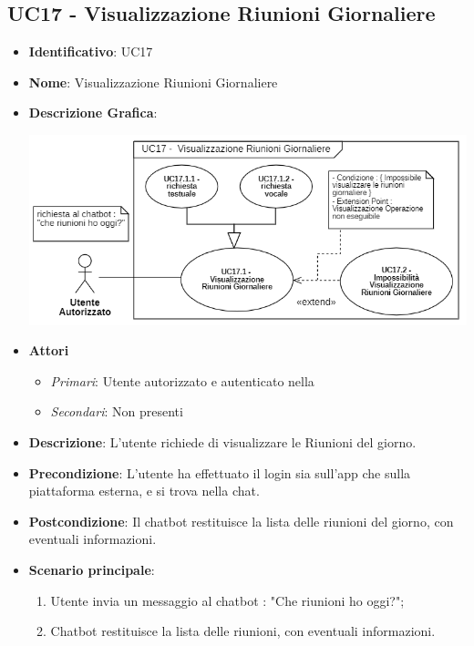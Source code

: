 \subsection{UC17 - Visualizzazione Riunioni Giornaliere }
\begin{itemize}
	\item \textbf{Identificativo}: UC17
	\item \textbf{Nome}: Visualizzazione Riunioni Giornaliere
	\item\textbf{Descrizione Grafica}: 
	\begin{center}
		\includegraphics[scale=0.65]{images/UC17.png} 
	\end{center}

	\item \textbf{Attori}
	\begin{itemize} 
		\item \textit{Primari}: Utente autorizzato e autenticato nella 
		\item \textit{Secondari}: Non presenti
	\end{itemize}
	\item \textbf{Descrizione}: L'utente richiede di visualizzare le Riunioni del giorno.
	\item \textbf{Precondizione}: L'utente ha effettuato il login sia sull'app che sulla piattaforma esterna, e si trova nella chat.
	\item \textbf{Postcondizione}: Il chatbot restituisce la lista delle riunioni del giorno, con eventuali informazioni.
	\item \textbf{Scenario principale}:  \begin{enumerate}
		\item Utente invia un messaggio al chatbot : "Che riunioni ho oggi?";
		\item Chatbot restituisce la lista delle riunioni, con eventuali informazioni.
	\end{enumerate}
\end{itemize}

